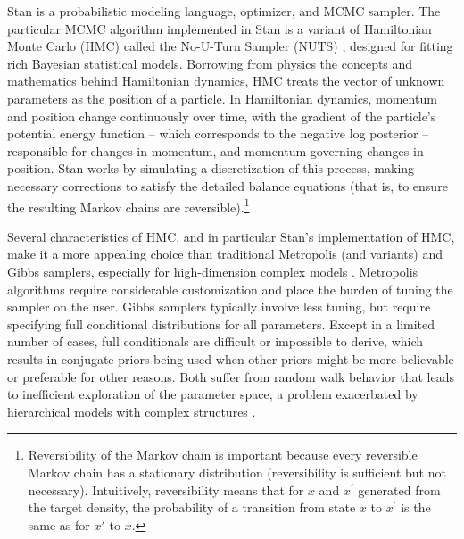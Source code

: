 Stan is a probabilistic modeling language, optimizer, and MCMC sampler. The particular MCMC 
algorithm implemented in Stan is a variant of Hamiltonian Monte Carlo (HMC) called the No-U-Turn 
Sampler (NUTS) , designed for fitting rich Bayesian statistical models. 
Borrowing from physics the concepts and mathematics behind Hamiltonian dynamics, HMC treats 
the vector of unknown parameters as the position of a particle. In Hamiltonian dynamics, momentum 
and position change continuously over time, with the gradient of the particle's potential energy function 
--  which corresponds to the negative log posterior -- responsible for changes in momentum, 
and momentum governing changes in position. Stan works by simulating a discretization of this 
process, making necessary corrections to satisfy the detailed balance equations (that is, to ensure 
the resulting Markov chains are reversible).\footnote{Reversibility of the Markov chain is important 
because every reversible Markov chain has a stationary distribution (reversibility is sufficient 
but not necessary). Intuitively, reversibility means that for $x$ and $x^\prime$ generated 
from the target density, the probability of a transition from state $x$ to $x^\prime$ 
is the same as for $x'$ to $x$.}  

Several characteristics of HMC, and in particular Stan's implementation of HMC, make it a more 
appealing choice than traditional Metropolis (and variants) and Gibbs samplers, especially for
high-dimension complex models . 
Metropolis algorithms require considerable customization and place the 
burden of tuning the sampler on the user. Gibbs samplers typically involve less tuning, but require 
specifying full conditional distributions for all parameters. Except in a limited number of cases, full 
conditionals are difficult or impossible to derive, which results in conjugate priors being used when 
other priors might be more believable or preferable for other reasons. Both suffer from random walk 
behavior that leads to inefficient exploration of the parameter space, a problem exacerbated 
by hierarchical models with complex structures .

